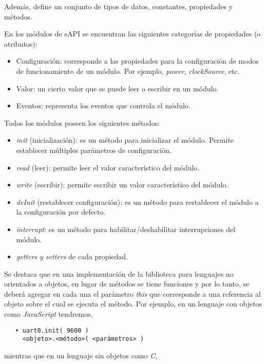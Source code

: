 Además, define un conjunto de tipos de datos, constantes, propiedades y métodos.

En los módulos de sAPI se encuentran las siguientes categorías de propiedades (o atributos):

\begin{itemize}
\item
Configuración: corresponde a las propiedades para la configuración de modos de funcionamiento de un módulo. Por ejemplo, \emph{power}, \emph{clockSource}, etc.
\item
Valor: un cierto valor que se puede leer o escribir en un módulo.
\item
Eventos: representa los eventos que controla el módulo.
\end{itemize}

Todos los módulos poseen los siguientes métodos:

\begin{itemize}
\item
\emph{init} (inicialización): es un método para inicializar el módulo. Permite establecer múltiples parámetros de configuración.
\item
\emph{read} (leer): permite leer el valor característico del módulo.
\item
\emph{write} (escribir): permite escribir un valor característico del módulo.
\item
\emph{deInit} (restablecer configuración): es un método para restablecer el módulo a la configuración por defecto.
\item
\emph{interrupt}: es un método para habilitar/deshabilitar interrupciones del módulo.
\item
\emph{getters y setters} de cada propiedad.
\end{itemize}

Se destaca que en una implementación de la biblioteca para lenguajes no orientados a objetos, en lugar de métodos se tiene funciones y por lo tanto, se deberá agregar en cada una el parámetro \emph{this} que corresponde a una referencia al objeto sobre el cual se ejecuta el método. Por ejemplo, en un lenguaje con objetos como \emph{JavaScript} tendremos,

\begin{verbatim}
   • uart0.init( 9600 )
     <objeto>.<método>( <parámetros> )
\end{verbatim}  

mientras que en un lenguaje sin objetos como \emph{C},

